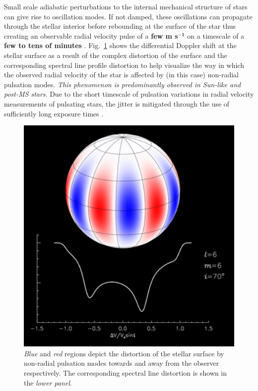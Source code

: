 Small scale adiabatic perturbations to the internal mechanical structure of 
stars can give rise to oscillation modes. If not damped, these oscillations 
can propagate through the stellar interior before rebounding at the surface 
of the star thus creating an observable radial velocity pulse of a 
\textbf{few m s$^{\mathbf{-1}}$} 
on a timescale of a \textbf{few to tens of minutes} \parencite{bedding01}. 
Fig.~\ref{fig:rvpulsation} shows the differential Doppler shift at the 
stellar surface as a result of the complex distortion of the surface and 
the corresponding spectral line profile distortion to help visualize the 
way in which the observed radial velocity of the star is affected by (in this 
case) non-radial pulsation modes. \emph{This phenomenon is predominantly 
observed in Sun-like and post-MS stars}. Due to the short timescale of 
pulsation variations in radial velocity measurements of pulsating stars, the 
jitter is mitigated through the use of sufficiently long exposure times 
\parencite{lovis05, dumusque11}. \\

\begin{figure}
\centering
\includegraphics[scale=.5]{figures/nonradial_pulsationsmall.png}
\caption{\emph{Blue} and \emph{red} regions depict the distortion of the
stellar surface by non-radial pulsation modes towards and away from the observer
respectively. The corresponding spectral line distortion is shown in the
\emph{lower panel}. \parencite[Image credit:][]{kochukhov16} \label{fig:rvpulsation}}
\end{figure}

